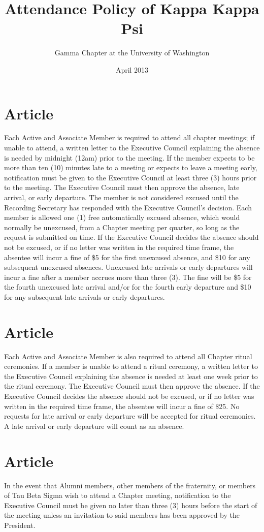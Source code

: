 \documentclass[11pt]{article}
\newcommand{\article}{\section{Article}}
\begin{document}
\title{Attendance Policy of Kappa Kappa Psi}
\author{Gamma Chapter at the University of Washington}
\date{April 2013}
\maketitle

\article
  Each Active and Associate Member is required to attend all chapter meetings; if unable to attend, a written letter to the Executive Council explaining the absence is needed by midnight (12am) prior to the meeting. 
  If the member expects to be more than ten (10) minutes late to a meeting or expects to leave a meeting early, notification must be given to the Executive Council at least three (3) hours prior to the meeting.
  The Executive Council must then approve the absence, late arrival, or early departure.
  The member is not considered excused until the Recording Secretary has responded with the Executive Council’s decision.
  Each member is allowed one (1) free automatically excused absence, which would normally be unexcused, from a Chapter meeting per quarter, so long as the request is submitted on time.
  If the Executive Council decides the absence should not be excused, or if no letter was written in the required time frame, the absentee will incur a fine of \$5 for the first unexcused absence, and \$10 for any subsequent unexcused absences.
  Unexcused late arrivals or early departures will incur a fine after a member accrues more than three (3).
  The fine will be \$5 for the fourth unexcused late arrival and/or for the fourth early departure and \$10 for any subsequent late arrivals or early departures.

\article
  Each Active and Associate Member is also required to attend all Chapter ritual ceremonies.
  If a member is unable to attend a ritual ceremony, a written letter to the Executive Council explaining the absence is needed at least one week prior to the ritual ceremony.
  The Executive Council must then approve the absence.
  If the Executive Council decides the absence should not be excused, or if no letter was written in the required time frame, the absentee will incur a fine of \$25.
  No requests for late arrival or early departure will be accepted for ritual ceremonies.
  A late arrival or early departure will count as an absence.

\article
  In the event that Alumni members, other members of the fraternity, or members of Tau Beta Sigma wish to attend a Chapter meeting, notification to the Executive Council must be given no later than three (3) hours before the start of the meeting unless an invitation to said members has been approved by the President.
\end{document}
